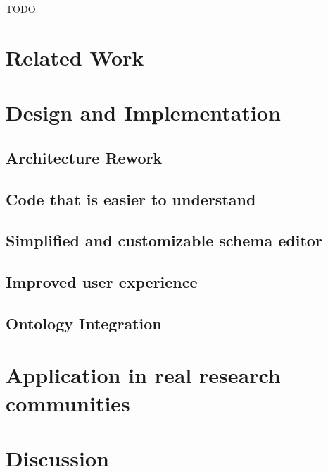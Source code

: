 \documentclass[lettersize,journal]{IEEEtran}
\begin{document}
TODO

 \section{Related Work}\label{sec:research}
 


 \section{Design and Implementation}\label{sec:design_and_implementation}
 

 \subsection{Architecture Rework}\label{subsec:architecture_rework}
 
 

 \subsection{Code that is easier to understand}\label{subsec:maintainability}
 
 
 
 
 \subsection{Simplified and customizable schema editor}\label{subsec:better_schema_editor}
 

 
 \subsection{Improved user experience}\label{subsec:better_schema_editor}
 


 \subsection{Ontology Integration}\label{subsec:ontology_integration}
 


 \section{Application in real research communities}\label{sec:application}
 



 \section{Discussion}\label{sec:discussion}
 
\end{document}
